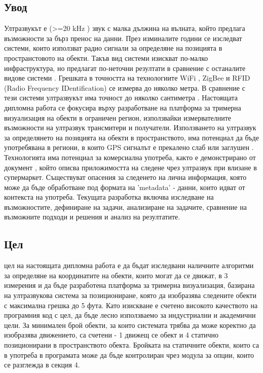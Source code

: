 \subsection{Увод}
\tab Ултразвукът е (>=20 kHz \cite{batmobile}) звук с малка дължина на вълната, който предлага възможности за бърз пренос на данни. През изминалите години се изследват системи, които използват радио сигнали за определяне на позицията в пространстовото на обекти. Такъв вид системи изискват по-малко инфраструктура, но предлагат по-неточни резултати в сравнение с останалите видове системи \cite{CarlosMedina}. Грешката в точността на технологиите WiFi \cite{wifi}, ZigBee \cite{zigbee} и RFID (Radio Frequency IDentification) \cite{rfid} се измерва до няколко метра. В сравнение с тези системи ултразвукът има точност до няколко сантиметра \cite{CarlosMedina} \cite{columbia}. Настоящата дипломна работа се фокусира върху разработване на платформа за тримерна визуализация на обекти в ограничен регион, използвайки измервателните възможности на ултразвук трансмитери и получатели. Използването на ултразвук за определянето на позицията на обекти в пространството, има потенциал да бъде употребявана в региони, в които GPS сигналът е прекалено слаб или заглушен \cite{yonei}. Технологията има потенциал за комерсиална употреба, както е демонстрирано от документ \cite{batmobile}, който описва приложимостта на следене чрез ултразвук при влизане в супермаркет. Съществуват опасения за следенето на лична информация, която може да бъде обработване под формата на 'metadata' - данни, които идват от контекста на употреба. Текущата разработка включва изследване на възможностите, дефиниране на задачи, анализиране на задачите, сравнение на възможните подходи и решения и анализ на резултатите. 

\subsection{Цел}
 цел на настоящата дипломна работа е да бъдат изследвани наличните алгоритми за определяне на координатите на обекти, които могат да се движат, в 3 измерения и да бъде разработена платформа за тримерна визуализация, базирана на ултразвукова система за позициониране, която да изобразява следените обекти с максимална грешка до 5 фута. Като изискване е счетено високото качеството на програмния код с цел, да бъде лесно използваемо за индустриални и академични цели. За минимален брой обекти, за които системата трябва да може коректно да изобразява движението, са счетени - 1 движещ се обект и 4 статично позиционирани в пространството обекта. Бройката на статичните обекти, които са в употреба в програмата може да бъде контролиран чрез модула за опции, които се разглежда в секция 4.

